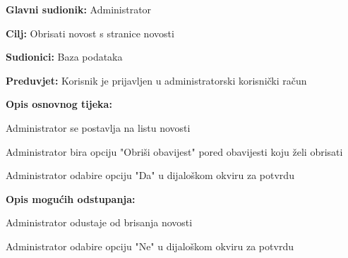		\noindent {}
		\begin{packed_item}
		
			\item \textbf{Glavni sudionik: } Administrator
			\item  \textbf{Cilj: } Obrisati novost s stranice novosti
			\item  \textbf{Sudionici: } Baza podataka
			\item  \textbf{Preduvjet: } Korisnik je prijavljen u administratorski korisnički račun
			\item  \textbf{Opis osnovnog tijeka:}
		
			\item[] \begin{packed_enum}
			
				\item Administrator se postavlja na listu novosti
				\item Administrator bira opciju "Obriši obavijest" pored obavijesti koju želi obrisati
				\item Administrator odabire opciju "Da" u dijaloškom okviru za potvrdu
			\end{packed_enum}
	
			\item  \textbf{Opis mogućih odstupanja:}
		
			\item[] \begin{packed_item}
			
				\item[2.a] Administrator odustaje od brisanja novosti
				\item[] \begin{packed_enum}
				
					\item Administrator odabire opciju "Ne" u dijaloškom okviru za potvrdu
				
				\end{packed_enum}
			\end{packed_item}
	
		\end{packed_item}

